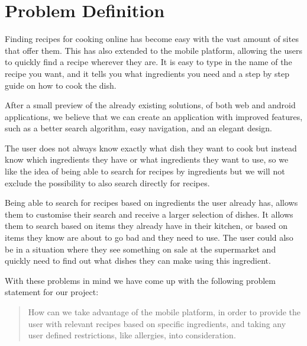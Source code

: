 \section{Problem Definition}\label{sec:probdef}

Finding recipes for cooking online has become easy with the vast amount of sites that offer them. This has also extended to the mobile platform, allowing the users to quickly find a recipe wherever they are. It is easy to type in the name of the recipe you want, and it tells you what ingredients you need and a step by step guide on how to cook the dish.

After a small preview of the already existing solutions, of both web and android applications, we believe that we can create an application with improved features, such as a better search algorithm, easy navigation, and an elegant design. 

The user does not always know exactly what dish they want to cook but instead know which ingredients they have or what ingredients they want to use, so we like the idea of being able to search for recipes by ingredients but we will not exclude the possibility to also search directly for recipes. 

Being able to search for recipes based on ingredients the user already has, allows them to customise their search and receive a larger selection of dishes. It allows them to search based on items they already have in their kitchen, or based on items they know are about to go bad and they need to use. The user could also be in a situation where they see something on sale at the supermarket and quickly need to find out what dishes they can make using this ingredient.

With these problems in mind we have come up with the following problem statement for our project:

\begin{quote}
How can we take advantage of the mobile platform, in order to provide the user with relevant recipes based on specific ingredients, and taking any user defined restrictions, like allergies, into consideration.
\end{quote}